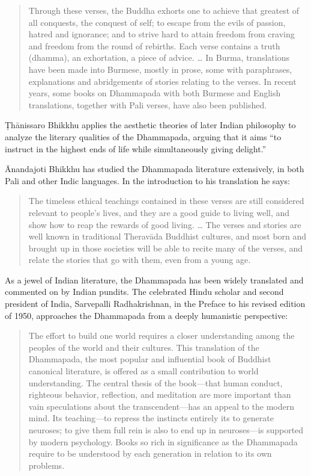 \documentclass[12pt,openany]{book}%
\begin{document}
\begin{quotation}%
Through these verses, the Buddha exhorts one to achieve that greatest of all conquests, the conquest of self; to escape from the evils of passion, hatred and ignorance; and to strive hard to attain freedom from craving and freedom from the round of rebirths. Each verse contains a truth (dhamma), an exhortation, a piece of advice. … In Burma, translations have been made into Burmese, mostly in prose, some with paraphrases, explanations and abridgements of stories relating to the verses. In recent years, some books on Dhammapada with both Burmese and English translations, together with Pali verses, have also been published.

%
\end{quotation}

\textsanskrit{Ṭhānissaro} Bhikkhu applies the aesthetic theories of later Indian philosophy to analyze the literary qualities of the Dhammapada, arguing that it aims “to instruct in the highest ends of life while simultaneously giving delight.”

Ānandajoti Bhikkhu has studied the Dhammapada literature extensively, in both Pali and other Indic languages. In the introduction to his translation he says:

\begin{quotation}%
The timeless ethical teachings contained in these verses are still considered relevant to people’s lives, and they are a good guide to living well, and show how to reap the rewards of good living. … The verses and stories are well known in traditional \textsanskrit{Theravāda} Buddhist cultures, and most born and brought up in those societies will be able to recite many of the verses, and relate the stories that go with them, even from a young age.

%
\end{quotation}

As a jewel of Indian literature, the Dhammapada has been widely translated and commented on by Indian pundits. The celebrated Hindu scholar and second president of India, Sarvepalli Radhakrishnan, in the Preface to his revised edition of 1950, approaches the Dhammapada from a deeply humanistic perspective:

\begin{quotation}%
The effort to build one world requires a closer understanding among the peoples of the world and their cultures. This translation of the Dhammapada, the most popular and influential book of Buddhist canonical literature, is offered as a small contribution to world understanding. The central thesis of the book—that human conduct, righteous behavior, reflection, and meditation are more important than vain speculations about the transcendent—has an appeal to the modern mind. Its teaching—to repress the instincts entirely its to generate neuroses; to give them full rein is also to end up in neuroses—is supported by modern psychology. Books so rich in significance as the Dhammapada require to be understood by each generation in relation to its own problems.

%
\end{quotation}
\end{document}
